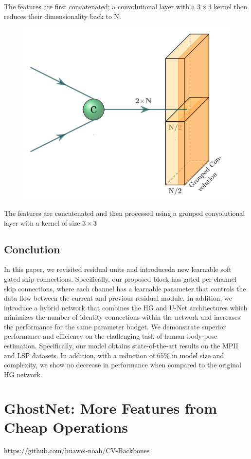 \documentclass[11pt]{article}
\begin{document}
The features are first concatenated; a convolutional layer with a $3\times 3$ kernel then reduces their dimensionality back to N.
\begin{figure}[H]
	\centering
	\includegraphics[scale = 0.4]{65}
\end{figure}
The features are concatenated and then processed using a grouped convolutional layer with a kernel of size $3\times 3$
\subsection{Conclution}
In this paper, we revisited residual units and introduceda new learnable soft gated skip connections. Specifically, our proposed block has gated per-channel skip connections, where each channel has a learnable parameter that controls the data flow between the current and previous residual module. In addition, we introduce a hybrid network that combines the HG and U-Net architectures which minimizes the number of identity connections within the network and increases the performance for the same parameter budget. We demonstrate superior performance and efficiency on the challenging task of human body-pose estimation. Specifically, our model obtains state-of-the-art results on the MPII and LSP datasets. In addition, with a reduction of 65\% in model size and complexity, we show no decrease in performance when compared to the original HG network.
\section{GhostNet: More Features from Cheap Operations}
$\text{https://github.com/huawei-noah/CV-Backbones}$
\end{document}
